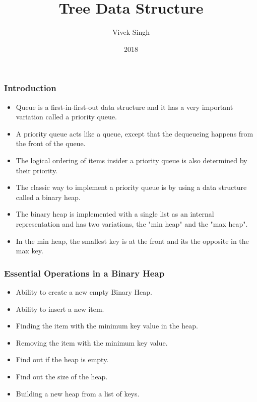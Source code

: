 \documentclass{beamer}
\title{Tree Data Structure}
\author{Vivek Singh}
\institute{Information Systems Decision Sciences (ISDS)\\
MUMA College of Business\\
University of South Florida \\
Tampa, Florida}
\date{2018}
\begin{document}
 
\frame{\titlepage}
\begin{frame}
\frametitle{Introduction}
\begin{itemize}
\item Queue is a first-in-first-out data structure and it has a very important variation called a priority queue.
\item A priority queue acts like a queue, except that the dequeueing happens from the front of the queue.
\item The logical ordering of items insider a priority queue is also determined by their priority.
\item The classic way to implement a priority queue is by using a data structure called a binary heap.
\item The binary heap is implemented with a single list as an internal representation and has two variations, the "min heap" and the "max heap".
\item In the min heap, the smallest key is at the front and its the opposite in the max key.
\end{itemize}
\end{frame}


\begin{frame}
\frametitle{Essential Operations in a Binary Heap}
\begin{itemize}
\item Ability to create a new empty Binary Heap.
\item Ability to insert a new item.
\item Finding the item with the minimum key value in the heap.
\item Removing the item with the minimum key value.
\item Find out if the heap is empty.
\item Find out the size of the heap.
\item Building a new heap from a list of keys.
\end{itemize}
\end{frame}
\end{document}
